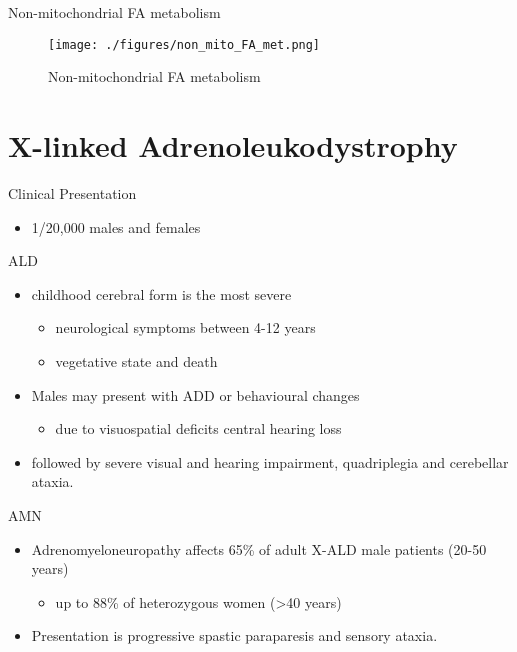 \documentclass[presentation, smaller]{beamer}
\begin{document}
\begin{frame}[label={sec:orge9fe90f}]{Non-mitochondrial FA metabolism}
\begin{figure}[htbp]
\centering
\texttt{[image: ./figures/non\_mito\_FA\_met.png]}
\caption[Non-mitochondrial FA metabolism]{\label{fig:org09c655a}
Non-mitochondrial FA metabolism}
\end{figure}
\end{frame}

\section{X-linked Adrenoleukodystrophy}
\label{sec:org39a7e54}
\begin{frame}[label={sec:orgc51d832}]{Clinical Presentation}
\begin{itemize}
\item 1/20,000 males and females
\end{itemize}
\begin{block}{ALD}
\begin{itemize}
\item childhood cerebral form is the most severe
\begin{itemize}
\item neurological symptoms between 4-12 years
\item vegetative state and death
\end{itemize}
\item Males may present with ADD or behavioural changes
\begin{itemize}
\item due to visuospatial deficits \textpm{} central hearing loss
\end{itemize}
\item followed by severe visual and hearing impairment, quadriplegia and
cerebellar ataxia.
\end{itemize}
\end{block}
\begin{block}{AMN}
\begin{itemize}
\item Adrenomyeloneuropathy affects 65\% of adult X-ALD male patients (20-50 years)
\begin{itemize}
\item up to 88\% of heterozygous women (\textgreater{}40 years)
\end{itemize}
\item Presentation is progressive spastic paraparesis and sensory ataxia.
\end{itemize}
\end{block}
\end{frame}
\end{document}
